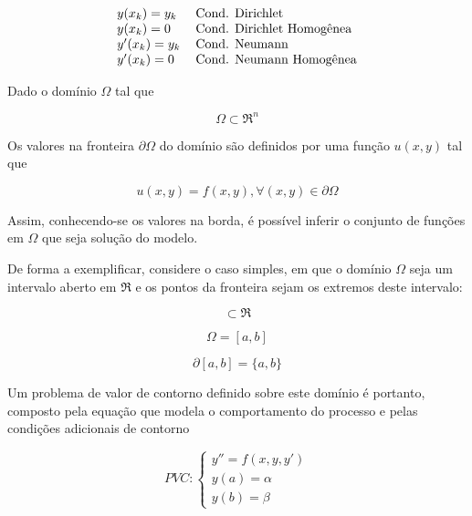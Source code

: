 \begin{equation}
	\begin{tabular}{l l}
		$y(x_k) = y_k $ 
		& Cond. Dirichlet \\
		$y(x_k) = 0$
		& Cond. Dirichlet Homogênea\  \\
		$y'(x_k) = y_k$
		& Cond. Neumann \\
		$y'(x_k) = 0$
		& Cond. Neumann Homogênea\  \\
	\end{tabular}
\end{equation}




Dado o domínio $ \Omega $ tal que

\begin{equation}
  \Omega \subset \Re^{n}
\end{equation}

Os valores na fronteira $ \partial \Omega $ do domínio são definidos por uma função $ u(x, y) $ tal que

\begin{equation}
  u(x, y) = f(x, y),  \forall (x, y) \in \partial \Omega
\end{equation}

Assim, conhecendo-se os valores na borda, é possível inferir o conjunto de funções em $ \Omega $ que seja solução do modelo. 

De forma a exemplificar, considere o caso simples, em que o domínio $ \Omega $ seja um intervalo aberto em $ \Re $ e os pontos da fronteira sejam os extremos deste intervalo: 

\begin{equation}
  [a, b] \subset \Re
\end{equation}

\begin{equation}
  \Omega = [a, b]
\end{equation}

\begin{equation}
  \partial [a, b] = \{ a, b \}
\end{equation}

Um problema de valor de contorno definido sobre este domínio é portanto, composto pela equação que modela o comportamento do processo e pelas condições adicionais de contorno


\begin{equation}
    \label{eq:pvc}
    PVC : 
    \begin{cases}
        y'' = f(x, y, y') \\
        y(a) = \alpha \\
        y(b) = \beta
    \end{cases}
\end{equation}

